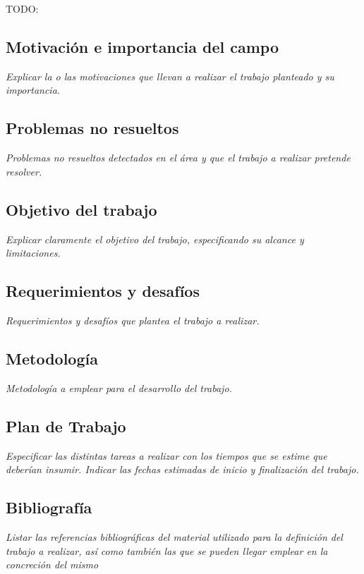 \documentclass[twoside]{report}
\begin{document}
TODO:

\subsection*{Motivación e importancia del campo}
{\it Explicar la o las motivaciones que llevan a realizar el trabajo planteado y su importancia.}

\lipsum[1]

\subsection*{Problemas no resueltos}
{\it Problemas no resueltos detectados en el área y que el trabajo a realizar pretende resolver.}

\lipsum[1]

\subsection*{Objetivo del trabajo}
{\it Explicar claramente el objetivo del trabajo, especificando su alcance y limitaciones.}

\lipsum[1]

\subsection*{Requerimientos y desafíos}
{\it Requerimientos y desafíos que plantea el trabajo a realizar.}

\lipsum[1]

\subsection*{Metodología}
{\it Metodología a emplear para el desarrollo del trabajo.}

\lipsum[1]

\subsection*{Plan de Trabajo}
{\it Especificar las distintas tareas a realizar con los tiempos que se
	estime que deberían insumir.
	Indicar las fechas estimadas de inicio y finalización del trabajo.
}

\lipsum[1]

\subsection*{Bibliografía}
{\it Listar las referencias bibliográficas del material utilizado para la definición del
	trabajo a realizar, así como también las que se pueden llegar emplear en la
	concreción del mismo}

\lipsum[1]
\end{document}
